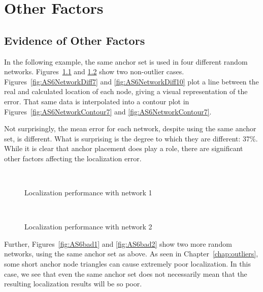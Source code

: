 \chapter{Other Factors}

\section{Evidence of Other Factors}

In the following example, the same anchor set is used in four different random networks.  Figures~\ref{fig:AS6good1} and \ref{fig:AS6good2} show two non-outlier cases.  Figures~\ref{fig:AS6NetworkDiff7} and \ref{fig:AS6NetworkDiff10} plot a line between the real and calculated location of each node, giving a visual representation of the error.  That same data is interpolated into a contour plot in Figures~\ref{fig:AS6NetworkContour7} and \ref{fig:AS6NetworkContour7}.

Not surprisingly, the mean error for each network, despite using the same anchor set, is different.  What is surprising is the degree to which they are different: 37\%.  While it is clear that anchor placement does play a role, there are significant other factors affecting the localization error.

\begin{figure}
  \centering
\\
	\caption{Localization performance with network 1}
	\label{fig:AS6good1}		
\end{figure}
\begin{figure}
  \centering
\\
	\caption{Localization performance with network 2}
	\label{fig:AS6good2}
\end{figure}

Further, Figures~\ref{fig:AS6bad1} and \ref{fig:AS6bad2} show two more random networks, using the same anchor set as above.  As seen in Chapter~\ref{chap:outliers}, some short anchor node triangles can cause extremely poor localization.  In this case, we see that even the same anchor set does not necessarily mean that the resulting localization results will be so poor.  

